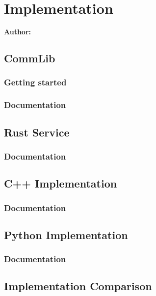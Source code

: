 \chapter{Implementation}

\textbf{Author: } 

\section{CommLib}
\subsection{Getting started}



\subsection{Documentation}

\section{Rust Service}
\subsection{Documentation}

\section{C++ Implementation}
\subsection{Documentation}

\section{Python Implementation}
\subsection{Documentation}

\section{Implementation Comparison}

\filbreak
